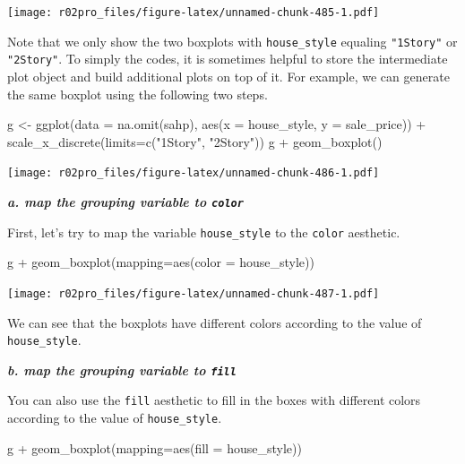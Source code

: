 \documentclass[
]{book}
\newenvironment{Shaded}{\begin{snugshade}}{\end{snugshade}}
\newcommand{\AttributeTok}[1]{\textcolor[rgb]{0.77,0.63,0.00}{#1}}
\newcommand{\FunctionTok}[1]{\textcolor[rgb]{0.00,0.00,0.00}{#1}}
\newcommand{\NormalTok}[1]{#1}
\newcommand{\OtherTok}[1]{\textcolor[rgb]{0.56,0.35,0.01}{#1}}
\newcommand{\SpecialCharTok}[1]{\textcolor[rgb]{0.00,0.00,0.00}{#1}}
\newcommand{\StringTok}[1]{\textcolor[rgb]{0.31,0.60,0.02}{#1}}
\begin{document}
\texttt{[image: r02pro\_files/figure-latex/unnamed-chunk-485-1.pdf]}

Note that we only show the two boxplots with \texttt{house\_style} equaling \texttt{"1Story"} or \texttt{"2Story"}. To simply the codes, it is sometimes helpful to store the intermediate plot object and build additional plots on top of it. For example, we can generate the same boxplot using the following two steps.

\begin{Shaded}
\begin{Highlighting}[]
\NormalTok{g }\OtherTok{\textless{}{-}} \FunctionTok{ggplot}\NormalTok{(}\AttributeTok{data =} \FunctionTok{na.omit}\NormalTok{(sahp), }\FunctionTok{aes}\NormalTok{(}\AttributeTok{x =}\NormalTok{ house\_style, }\AttributeTok{y =}\NormalTok{ sale\_price)) }\SpecialCharTok{+} \FunctionTok{scale\_x\_discrete}\NormalTok{(}\AttributeTok{limits=}\FunctionTok{c}\NormalTok{(}\StringTok{"1Story"}\NormalTok{, }\StringTok{"2Story"}\NormalTok{))}
\NormalTok{g }\SpecialCharTok{+} \FunctionTok{geom\_boxplot}\NormalTok{()}
\end{Highlighting}
\end{Shaded}

\texttt{[image: r02pro\_files/figure-latex/unnamed-chunk-486-1.pdf]}

\textbf{\emph{a. map the grouping variable to \texttt{color}}}

First, let's try to map the variable \texttt{house\_style} to the \texttt{color} aesthetic.

\begin{Shaded}
\begin{Highlighting}[]
\NormalTok{g }\SpecialCharTok{+} \FunctionTok{geom\_boxplot}\NormalTok{(}\AttributeTok{mapping=}\FunctionTok{aes}\NormalTok{(}\AttributeTok{color =}\NormalTok{ house\_style))}
\end{Highlighting}
\end{Shaded}

\texttt{[image: r02pro\_files/figure-latex/unnamed-chunk-487-1.pdf]}

We can see that the boxplots have different colors according to the value of \texttt{house\_style}.

\textbf{\emph{b. map the grouping variable to \texttt{fill}}}

You can also use the \texttt{fill} aesthetic to fill in the boxes with different colors according to the value of \texttt{house\_style}.

\begin{Shaded}
\begin{Highlighting}[]
\NormalTok{g }\SpecialCharTok{+} \FunctionTok{geom\_boxplot}\NormalTok{(}\AttributeTok{mapping=}\FunctionTok{aes}\NormalTok{(}\AttributeTok{fill =}\NormalTok{ house\_style))}
\end{Highlighting}
\end{Shaded}
\end{document}
